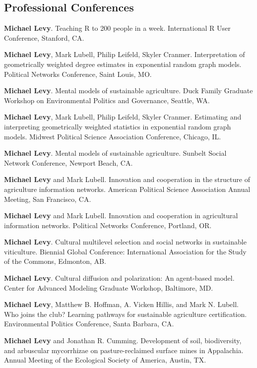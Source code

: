 \subsection{Professional Conferences}\label{professional-conferences}

\begin{description}
\tightlist
\item[2016]
\textbf{Michael Levy}. Teaching R to 200 people in a week. International
R User Conference, Stanford, CA.
\item[2016]
\textbf{Michael Levy}, Mark Lubell, Philip Leifeld, Skyler Cranmer.
Interpretation of geometrically weighted degree estimates in exponential
random graph models. Political Networks Conference, Saint Louis, MO.
\item[2016]
\textbf{Michael Levy}. Mental models of sustainable agriculture. Duck
Family Graduate Workshop on Environmental Politics and Governance,
Seattle, WA.
\item[2016]
\textbf{Michael Levy}, Mark Lubell, Philip Leifeld, Skyler Cranmer.
Estimating and interpreting geometrically weighted statistics in
exponential random graph models. Midwest Political Science Association
Conference, Chicago, IL.
\item[2016]
\textbf{Michael Levy}. Mental models of sustainable agriculture. Sunbelt
Social Network Conference, Newport Beach, CA.
\item[2015]
\textbf{Michael Levy} and Mark Lubell. Innovation and cooperation in the
structure of agriculture information networks. American Political
Science Association Annual Meeting, San Francisco, CA.
\item[2015]
\textbf{Michael Levy} and Mark Lubell. Innovation and cooperation in
agricultural information networks. Political Networks Conference,
Portland, OR.
\item[2015]
\textbf{Michael Levy}. Cultural multilevel selection and social networks
in sustainable viticulture. Biennial Global Conference: International
Association for the Study of the Commons, Edmonton, AB.
\item[2014]
\textbf{Michael Levy}. Cultural diffusion and polarization: An
agent-based model. Center for Advanced Modeling Graduate Workshop,
Baltimore, MD.
\item[2014]
\textbf{Michael Levy}, Matthew B. Hoffman, A. Vicken Hillis, and Mark N.
Lubell. Who joins the club? Learning pathways for sustainable
agriculture certification. Environmental Politics Conference, Santa
Barbara, CA.
\item[2011]
\textbf{Michael Levy} and Jonathan R. Cumming. Development of soil,
biodiversity, and arbuscular mycorrhizae on pasture-reclaimed surface
mines in Appalachia. Annual Meeting of the Ecological Society of
America, Austin, TX.
\end{description}

